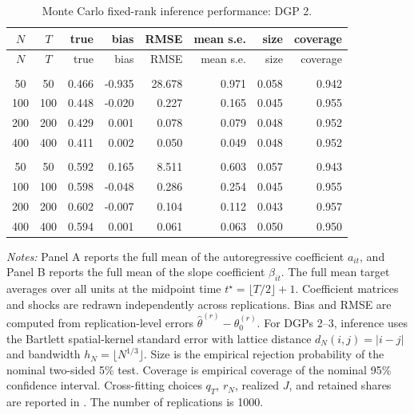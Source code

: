 \begingroup
\small
\setlength{\LTleft}{0pt plus 1fill}
\setlength{\LTright}{0pt plus 1fill}
\begin{longtable}{ccrrrrrr}
\caption{Monte Carlo fixed-rank inference performance: DGP 2.}\label{tab:mc_perf_dgp2}\\
\toprule
$N$ & $T$ & true & bias & RMSE & mean s.e. & size & coverage \\
\midrule
\endfirsthead
\toprule
$N$ & $T$ & true & bias & RMSE & mean s.e. & size & coverage \\
\midrule
\endhead
\bottomrule
\endfoot
\multicolumn{8}{l}{\textit{Panel A. Autoregressive coefficient full mean}}\\
50 & 50 & 0.466 & -0.935 & 28.678 & 0.971 & 0.058 & 0.942 \\
100 & 100 & 0.448 & -0.020 & 0.227 & 0.165 & 0.045 & 0.955 \\
200 & 200 & 0.429 & 0.001 & 0.078 & 0.079 & 0.048 & 0.952 \\
400 & 400 & 0.411 & 0.002 & 0.050 & 0.049 & 0.048 & 0.952 \\
\addlinespace
\multicolumn{8}{l}{\textit{Panel B. Slope coefficient full mean}}\\
50 & 50 & 0.592 & 0.165 & 8.511 & 0.603 & 0.057 & 0.943 \\
100 & 100 & 0.598 & -0.048 & 0.286 & 0.254 & 0.045 & 0.955 \\
200 & 200 & 0.602 & -0.007 & 0.104 & 0.112 & 0.043 & 0.957 \\
400 & 400 & 0.594 & 0.001 & 0.061 & 0.063 & 0.050 & 0.950 \\
\end{longtable}
\par\smallskip
{\footnotesize\begin{minipage}{0.92\textwidth}\textit{Notes:} Panel A reports the full mean of the autoregressive coefficient $a_{it}$, and Panel B reports the full mean of the slope coefficient $\beta_{it}$. The full mean target averages over all units at the midpoint time $t^\star=\lfloor T/2\rfloor+1$. Coefficient matrices and shocks are redrawn independently across replications. Bias and RMSE are computed from replication-level errors $\widehat\theta^{(r)}-\theta_0^{(r)}$. For DGPs 2--3, inference uses the Bartlett spatial-kernel standard error with lattice distance $d_N(i,j)=|i-j|$ and bandwidth $h_N=\lfloor N^{1/3}\rfloor$. Size is the empirical rejection probability of the nominal two-sided 5\% test. Coverage is empirical coverage of the nominal 95\% confidence interval. Cross-fitting choices $q_T$, $r_N$, realized $J$, and retained shares are reported in . The number of replications is 1000.\end{minipage}}
\endgroup
